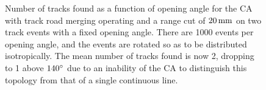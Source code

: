 \begin{figure}
\centering
{}
\caption[Track count as a function of angle for CA with merging and range cut operating on toy MC events]{\label{fig:ca_toy_rcut_trackcounts}Number of tracks found as a function of opening angle for the \ac{CA} with track road merging operating and a range cut of $20\,\mathrm{mm}$ on two track events with a fixed opening angle. There are 1000 events per opening angle, and the events are rotated so as to be distributed isotropically. The mean number of tracks found is now 2, dropping to 1 above $140^\circ$ due to an inability of the \ac{CA} to distinguish this topology from that of a single continuous line.}
\end{figure}

